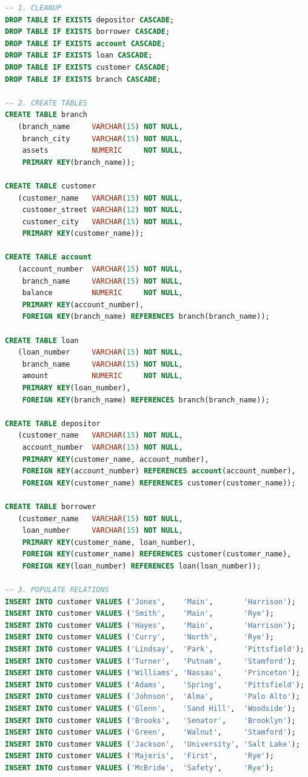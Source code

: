 \documentclass[12pt,a4paper]{article}
\begin{document}
\begin{lstlisting}[language=SQL, caption={lab\_12\_setup.sql}]
-- 1. CLEANUP
DROP TABLE IF EXISTS depositor CASCADE;
DROP TABLE IF EXISTS borrower CASCADE;
DROP TABLE IF EXISTS account CASCADE;
DROP TABLE IF EXISTS loan CASCADE;
DROP TABLE IF EXISTS customer CASCADE;
DROP TABLE IF EXISTS branch CASCADE;

-- 2. CREATE TABLES
CREATE TABLE branch
   (branch_name     VARCHAR(15) NOT NULL,
    branch_city     VARCHAR(15) NOT NULL,
    assets          NUMERIC     NOT NULL,
    PRIMARY KEY(branch_name));
    
CREATE TABLE customer
   (customer_name   VARCHAR(15) NOT NULL,
    customer_street VARCHAR(12) NOT NULL,
    customer_city   VARCHAR(15) NOT NULL,
    PRIMARY KEY(customer_name));

CREATE TABLE account
   (account_number  VARCHAR(15) NOT NULL,
    branch_name     VARCHAR(15) NOT NULL,
    balance         NUMERIC     NOT NULL,
    PRIMARY KEY(account_number),
    FOREIGN KEY(branch_name) REFERENCES branch(branch_name));

CREATE TABLE loan
   (loan_number     VARCHAR(15) NOT NULL,
    branch_name     VARCHAR(15) NOT NULL,
    amount          NUMERIC     NOT NULL,
    PRIMARY KEY(loan_number),
    FOREIGN KEY(branch_name) REFERENCES branch(branch_name));

CREATE TABLE depositor
   (customer_name   VARCHAR(15) NOT NULL,
    account_number  VARCHAR(15) NOT NULL,
    PRIMARY KEY(customer_name, account_number),
    FOREIGN KEY(account_number) REFERENCES account(account_number),
    FOREIGN KEY(customer_name) REFERENCES customer(customer_name));

CREATE TABLE borrower
   (customer_name   VARCHAR(15) NOT NULL,
    loan_number     VARCHAR(15) NOT NULL,
    PRIMARY KEY(customer_name, loan_number),
    FOREIGN KEY(customer_name) REFERENCES customer(customer_name),
    FOREIGN KEY(loan_number) REFERENCES loan(loan_number));

-- 3. POPULATE RELATIONS
INSERT INTO customer VALUES ('Jones',    'Main',       'Harrison');
INSERT INTO customer VALUES ('Smith',    'Main',       'Rye');
INSERT INTO customer VALUES ('Hayes',    'Main',       'Harrison');
INSERT INTO customer VALUES ('Curry',    'North',      'Rye');
INSERT INTO customer VALUES ('Lindsay',  'Park',       'Pittsfield');
INSERT INTO customer VALUES ('Turner',   'Putnam',     'Stamford');
INSERT INTO customer VALUES ('Williams', 'Nassau',     'Princeton');
INSERT INTO customer VALUES ('Adams',    'Spring',     'Pittsfield');
INSERT INTO customer VALUES ('Johnson',  'Alma',       'Palo Alto');
INSERT INTO customer VALUES ('Glenn',    'Sand Hill',  'Woodside');
INSERT INTO customer VALUES ('Brooks',   'Senator',    'Brooklyn');
INSERT INTO customer VALUES ('Green',    'Walnut',     'Stamford');
INSERT INTO customer VALUES ('Jackson',  'University', 'Salt Lake');
INSERT INTO customer VALUES ('Majeris',  'First',      'Rye');
INSERT INTO customer VALUES ('McBride',  'Safety',     'Rye');


\end{lstlisting}
\end{document}
